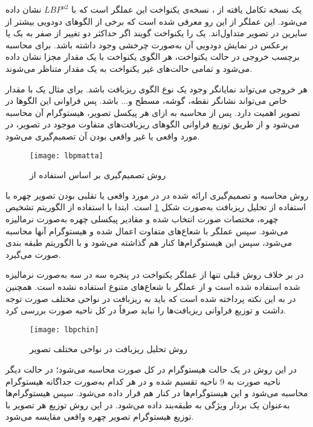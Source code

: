 یک نسخه تکامل یافته از ، نسخه‌ی یکنواخت این عملگر است که با 
$LBP^{u2}$
 نشان داده می‌شود. این عملگر از این رو معرفی شده است که برخی از الگوهای دودویی بیشتر از سایرین در تصویر متداول‌اند. یک  را یکنواخت گویند اگر حداکثر دو تغییر از صفر به یک یا برعکس در نمایش دودویی آن به‌صورت چرخشی وجود داشته باشد. برای محاسبه برچسب خروجی در حالت یکنواخت، هر الگوی یکنواخت با یک مقدار مجزا نشان داده می‌شود و تمامی حالت‌های غیر یکنواخت به یک مقدار متناظر می‌شوند.

هر خروجی  می‌تواند نمایانگر وجود یک نوع الگوی ریزبافت باشد. برای مثال یک  با مقدار خاص می‌تواند نشانگر نقطه، گوشه، مسطح و... باشد. پس فراوانی این الگوها در تصویر اهمیت دارد. پس از محاسبه  به ازای هر پیکسل تصویر، هیستوگرام آن محاسبه می‌شود و از طریق توزیع فراوانی الگوهای ریزبافت‌های متفاوت موجود در تصویر، در مورد واقعی یا غیر واقعی بودن آن تصمیم‌گیری می‌شود.
\begin{figure}[hb]
	\centerline{\texttt{[image: lbpmatta]}}
	\caption{روش تصمیم‌گیری بر اساس استفاده از  \cite{maatta2011face}}
	\label{fig:lbpmatta}
\end{figure}

روش محاسبه و تصمیم‌گیری ارائه شده در 
\cite{maatta2011face}
در مورد واقعی یا تقلبی بودن تصویر چهره با استفاده از تحلیل ریزبافت به‌صورت شکل
\ref{fig:lbpmatta}
است.
ابتدا با استفاده از الگوریتم تشخیص چهره، مختصات صورت انتخاب شده و مقادیر پیکسلی چهره به‌صورت نرمالیزه می‌شود. سپس عملگر  با شعاع‌های متفاوت اعمال شده و هیستوگرام آنها محاسبه می‌شود، سپس این هیستوگرام‌ها کنار هم گذاشته می‌شود و با الگوریتم  طبقه بندی صورت می‌گیرد.

در 
\cite{chingovska2012effectiveness}
بر خلاف روش قبلی تنها از عملگر  یکنواخت در پنجره سه در سه به‌صورت نرمالیزه شده استفاده شده است و از عملگر  با شعاع‌های متنوع 
\cite{maatta2011face}
استفاده نشده است. همچنین در 
\cite{chingovska2012effectiveness}
به این نکته پرداخته شده است که باید به ریزبافت در نواحی مختلف صورت توجه داشت و توزیع فراوانی ریزبافت‌ها را نباید صرفاً در کل ناحیه صورت بررسی کرد.
\begin{figure}[t]
	\centerline{\texttt{[image: lbpchin]}}
	\caption{روش تحلیل ریزبافت در نواحی مختلف تصویر \cite{chingovska2012effectiveness}}
	\label{fig:lbpchin}
\end{figure}
در این روش در یک حالت هیستوگرام  در کل صورت محاسبه می‌شود؛ در حالت دیگر ناحیه صورت به 9 ناحیه تقسیم شده و در هر کدام به‌صورت جداگانه هیستوگرام  محاسبه می‌شود و این هیستوگرام‌ها در کنار هم قرار داده می‌شود. سپس هیستوگرام‌ها به‌عنوان یک بردار ویژگی به طبقه‌بند داده می‌شود. در این روش توزیع هر تصویر با توزیع هیستوگرام تصویر چهره واقعی مقایسه می‌شود.

